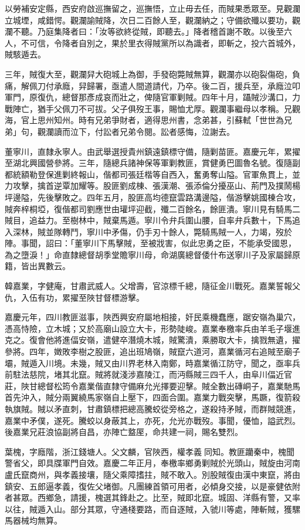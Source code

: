 \begin{pinyinscope}
以勞補安定縣，西安府啟巡撫留之，巡撫悟，立止毋去任，而賊果悉眾至。見觀瀾立城堙，咸錯愕。觀瀾諭賊降，次日二百餘人至，觀瀾納之；守備欲殲以要功，觀瀾不聽。乃庭集降者曰：「汝等欲終從賊，即聽去。」降者稽首謝不敢。以後至六人，不可信，令降者自別之，果於里衣得賊黨所以為識者，即斬之，投六首城外，賊駭遁去。

三年，賊復大至，觀瀾舁大砲城上為御，手發砲斃賊無算，觀瀾亦以砲裂傷砲，負痛，解佩刀付承廕，舁歸署，亟遣人間道請代，乃卒。後二百，援兵至，承廕泣叩軍門，原復仇，總督那彥成哀而壯之，俾隨官軍剿賊。四年十月，躡賊沙溝口，力戰陣亡，猶手父佩刀不可拔。父子俱歿王事，賜恤尤厚。觀瀾事繼母以孝稱。兄觀海，官上思州知州。時有兄弟爭財者，適得思州書，念弟甚，引蘇軾「世世為兄弟」句，觀瀾讀而泣下，付訟者兄弟令閱。訟者感悔，泣謝去。

董寧川，直隸永寧人。由武舉選授貴州鎮遠鎮標守備，隨剿苗匪。嘉慶元年，累擢至湖北興國營參將。三年，隨總兵諸神保等軍剿教匪，賞健勇巴圖魯名號。復隨副都統額勒登保進剿終報山，偕都司張廷楷等自西入，奮勇奪山隘。官軍魚貫上，並力攻擊，擒首逆覃加耀等。股匪劉成棟、張漢潮、張添倫分擾巫山、荊門及撲鬧楊坪邊隘，先後擊敗之。四年五月，股匪高均德竄雲路溝邊隘，偕游擊姚國棟合攻，賊奔梓桐埡，復偕都司劉應世由瓘坪迎截，殲二百餘名，餘匪潰。寧川見有騎馬二賊目，追益力。至樹林中，賊棄馬遁。寧川令弁兵圍山腰，自率弁兵數十，下馬追入深林，賊並隊轉鬥，寧川中矛傷，仍手刃十餘人，斃騎馬賊一人，力竭，歿於陣。事聞，詔曰：「董寧川下馬擊賊，至被戕害，似此忠勇之臣，不能承受國恩，為之墮淚！」命直隸總督胡季堂贍寧川母，命湖廣總督倭什布送寧川子及家屬歸原籍，皆出異數云。

韓嘉業，字健庵，甘肅武威人。父增壽，官涼標千總，隨征金川戰死。嘉業誓報父仇，入伍有功，累擢至陜甘督標游擊。

嘉慶元年，四川教匪滋事，陜西興安府屬地相接，奸民乘機蠢應，踞安嶺為巢穴，憑高恃險，立木城；又於高廟山設立大卡，形勢陡峻。嘉業奉檄率兵由羊毛子堰進克之。復會他將進偪安嶺，遣健卒潛燒木城，賊驚潰，乘勝取大卡，擒戮無遺，擢參將。四年，嬍敗李樹之股匪，追出班鳩嶺，賊竄六道河，嘉業循河右追賊至廟子壩，賊遁入川境。未幾，賊又由川界老林入南鄭，時嘉業循江防守，聞之，亟率兵前駐法慈院，堵其北竄。賊將就淺涉嘉陵江，而沔縣賊三四千人，由阜川偪近官莊，陜甘總督松筠令嘉業偕直隸守備麻允光擇要迎擊。賊全數出磚峒子，嘉業馳馬首先沖入，賊分兩翼繞馬家嶺自上壓下，四面合圍。嘉業力戰突擊，馬蹶，復箭殺執旗賊。賊以矛直刺，甘肅鎮標把總高騰蛟從旁格之，遂殺持矛賊，而群賊競進，嘉業中矛僕，遂死。騰蛟以身蔽其上，亦死，允光亦戰歿。事聞，優恤，謚武烈。後嘉業兄莊浪協副將自昌，亦陣亡盩厔，命共建一祠，賜名雙烈。

葉槐，字廕階，浙江錢塘人。父文麟，官陜西，權孝義同知。教匪躪秦中，槐聞警省父，即具牒軍門自效。嘉慶二年正月，奉檄率鄉勇剿賊於光頭山，賊旋由河南盧氏竄商州，與孝義接壤，隨父乘障搘拄，賊不敢入。別股賊復由漢中東竄，將由鎮安、五郎逼孝義，復佐父堵御。凡團練首領可用者，必傾身交接，以是豪健依附者甚眾。西鄉急，請援，槐選其鋒赴之。比至，賊即北竄。城固、洋縣有警，又率以往，賊遁入山。部分其眾，守通棧要路，而自逐賊，入虢川等處，陣斬賊，獲騾馬器械均無算。


\end{pinyinscope}
